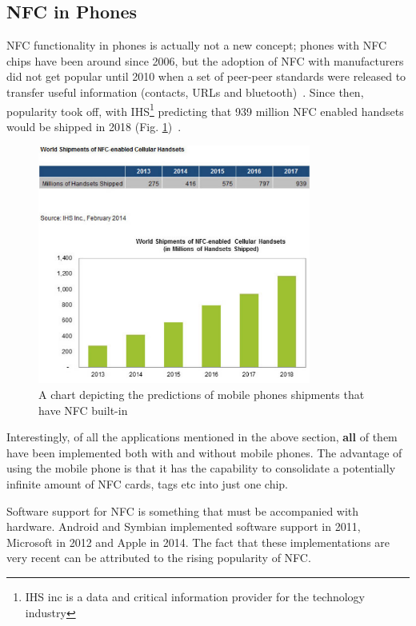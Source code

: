 \subsection{NFC in Phones}
NFC functionality in phones is actually not a new concept; phones with NFC chips have been around since 2006, but the adoption of NFC with manufacturers did not get popular until 2010 when a set of peer-peer standards were released to transfer useful information (contacts, URLs and bluetooth)~\cite{iso18092}. Since then, popularity took off, with IHS\footnote{IHS inc is a data and critical information provider for the technology industry} predicting that 939 million NFC enabled handsets would be shipped in 2018 (Fig. \ref{fig:smartphoneshipments})~\cite{IHSchart}.
\begin{figure}[H]
  \centering
    \includegraphics[width=0.8\textwidth]{img/smartphoneNFC.png}
      \caption{A chart depicting the predictions of mobile phones shipments that have NFC built-in}
       \label{fig:smartphoneshipments}
\end{figure}

Interestingly, of all the applications mentioned in the above section, \textbf{all} of them have been implemented both with and without mobile phones. The advantage of using the mobile phone is that it has the capability to consolidate a potentially infinite amount of NFC cards, tags etc into just one chip.

Software support for NFC is something that must be accompanied with hardware. Android and Symbian implemented software support in 2011, Microsoft in 2012 and Apple in 2014. The fact that these implementations are very recent can be attributed to the rising popularity of NFC. 

